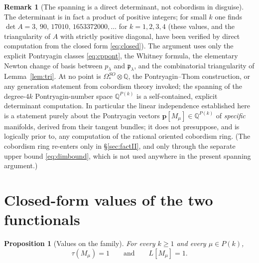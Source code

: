 \documentclass[12pt]{article}
\newtheorem{proposition}{Proposition}
\theoremstyle{definition}
\newtheorem{remark}{Remark}
\begin{document}
\begin{remark}[The spanning is a direct determinant, not cobordism in disguise]
The determinant is in fact a product of positive integers; for small $k$ one finds
$\det A=3,\,90,\,17010,\,1653372000,\dots$ for $k=1,2,3,4$ (these values, and the
triangularity of $A$ with strictly positive diagonal, have been verified by direct
computation from the closed form \eqref{eq:closed}).  The argument uses only the
explicit Pontryagin classes \eqref{eq:cppont}, the Whitney formula, the elementary Newton
change of basis between $p_\lambda$ and $\mathfrak{p}_\lambda$, and the combinatorial
triangularity of Lemma~\ref{lem:tri}.  At no point is $\Omega^{SO}_\ast\otimes\mathbb{Q}$,
the Pontryagin--Thom construction, or any generation statement from cobordism theory
invoked; the spanning of the degree-$4k$ Pontryagin-number space $\mathbb{Q}^{P(k)}$ is a
self-contained, explicit determinant computation.  In particular the linear independence
established here is a statement purely about the Pontryagin vectors
$\mathbf p[M_\mu]\in\mathbb{Q}^{P(k)}$ of \emph{specific} manifolds, derived from
their tangent bundles; it does not presuppose, and is logically prior to, any computation
of the rational oriented cobordism ring.  (The cobordism ring re-enters only in
\S\ref{sec:factII}, and only through the separate upper bound \eqref{eq:dimbound}, which
is not used anywhere in the present spanning argument.)
\end{remark}

\bigskip

\section{Closed-form values of the two functionals}

\begin{proposition}[Values on the family]\label{prop:values}
For every $k\ge 1$ and every $\mu\in P(k)$,
\[
\tau(M_\mu)=1
\qquad\text{and}\qquad
L[M_\mu]=1.
\]
\end{proposition}
\end{document}
